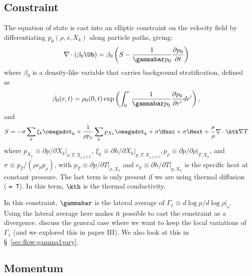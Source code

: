 \subsection{Constraint}

The equation of state is cast into an elliptic constraint on the
velocity field by differentiating $p_0(\rho, s, X_k)$ along particle
paths, giving:
\begin{equation}
\nabla \cdot (\beta_0 \Ub) = 
   \beta_0 \left ( S - \frac{1}{\gammabar p_0} \frac{\partial p_0}{\partial t} \right )
\label{eq:U divergence}
\end{equation}
where $\beta_0$ is a density-like variable that carries background
 stratification, defined as
\begin{equation}
\beta_0(r,t) = \rho_0(0,t)\exp\left(\int_0^r\frac{1}{\gammabar p_0}\frac{\partial p_0}{\partial r'}dr'\right),
\end{equation}
and 
\begin{equation}
S = -\sigma\sum_k\xi_k\omegadot_k + \frac{1}{\rho p_\rho}\sum_k p_{X_k}\omegadot_k + \sigma\Hnuc + \sigma\Hext + \frac{\sigma}{\rho} \nabla \cdot \kth \nabla T
\end{equation}
where $p_{X_k} \equiv \left. \partial p / \partial X_k
\right|_{\rho,T,X_{j,j\ne k}}$, $\xi_k \equiv \left. \partial h / 
\partial X_k \right |_{p,T,X_{j,j\ne k}}, 
p_\rho \equiv \left. \partial p/\partial \rho \right |_{T, X_k}$, and
$\sigma \equiv p_T/(\rho c_p p_\rho)$, with
$p_T \equiv \left. \partial p / \partial T \right|_{\rho, X_k}$ and
$c_p \equiv \left.  \partial h / \partial T
\right|_{p,X_k}$ is the specific heat at constant pressure.   The last
term is only present if we are using thermal diffusion ( {\tt = T}).  In this term, $\kth$ is the thermal conductivity.

In this constraint, $\gammabar$ is the lateral average of
$\Gamma_1 \equiv d\log p / d\log \rho |_s$.  Using the lateral average
here makes it possible to cast the constraint as a
divergence.  \cite{KP:2012} discuss the general case where we want to
keep the local variations of $\Gamma_1$ (and we explored this in paper
III).  We also look at this in \S~\ref{sec:flow:gamma1vary}.




\subsection{Momentum}

